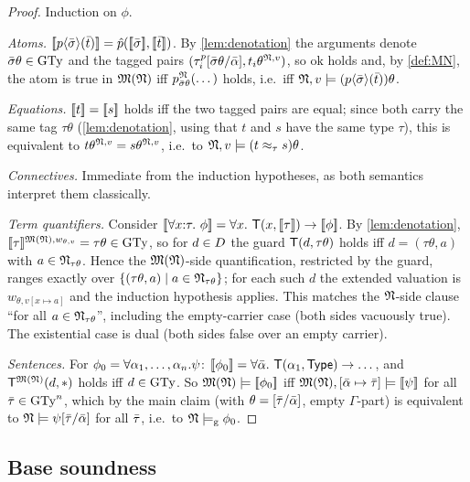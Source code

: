 \begin{proof}
  Induction on $\phi$.

  \emph{Atoms.}  $[\![ p\langle\bar{\sigma}\rangle(\bar{t}) ]\!] =
  \hat p([\![ \bar{\sigma} ]\!],[\![ \bar{t} ]\!])$.  By \cref{lem:denotation} the
  arguments denote $\bar{\sigma}\theta \in \mathrm{GTy}$ and the tagged pairs
  $(\tau^p_i[\bar{\sigma}\theta/\bar{\alpha}], t_i\theta^{\mathfrak{N},v})$, so
  $\mathrm{ok}$ holds and, by \cref{def:MN}, the atom is true in $\mathfrak{M}(\mathfrak{N})$ iff
  $p^{\mathfrak{N}}_{\bar{\sigma}\theta}(\dots)$ holds, i.e.\ iff
  $\mathfrak{N},v \models (p\langle\bar{\sigma}\rangle(\bar{t}))\theta$.

  \emph{Equations.}  $[\![ t ]\!] = [\![ s ]\!]$ holds iff the two tagged pairs are
  equal; since both carry the same tag $\tau\theta$
  (\cref{lem:denotation}, using that $t$ and $s$ have the same type
  $\tau$), this is equivalent to
  $t\theta^{\mathfrak{N},v} = s\theta^{\mathfrak{N},v}$, i.e.\ to
  $\mathfrak{N},v \models (t \approx_{\tau} s)\theta$.

  \emph{Connectives.}  Immediate from the induction hypotheses, as both
  semantics interpret them classically.

  \emph{Term quantifiers.}  Consider
  $\enc{\forall x{:}\tau.\ \phi} = \forall x.\ \T(x,\enc{\tau}) \imp
  \enc{\phi}$.  By \cref{lem:denotation},
  $[\![ \tau ]\!]^{\mathfrak{M}(\mathfrak{N}),w_{\theta,v}} = \tau\theta \in \mathrm{GTy}$, so for
  $d \in D$ the guard $\mathsf{T}(d, \tau\theta)$ holds iff $d = (\tau\theta, a)$
  with $a \in \mathfrak{N}_{\tau\theta}$.  Hence the $\mathfrak{M}(\mathfrak{N})$-side quantification,
  restricted by the guard, ranges exactly over
  $\{(\tau\theta,a) \mid a \in \mathfrak{N}_{\tau\theta}\}$; for each such $d$ the
  extended valuation is $w_{\theta, v[x \mapsto a]}$ and the induction
  hypothesis applies.  This matches the $\mathfrak{N}$-side clause ``for all
  $a \in \mathfrak{N}_{\tau\theta}$'', including the empty-carrier case (both sides
  vacuously true).  The existential case is dual (both sides false over an
  empty carrier).

  \emph{Sentences.}  For
  $\phi_0 = \forall\alpha_1,\dots,\alpha_{n}.\psi$:
  $\enc{\phi_0} = \forall\tup\alpha.\ \T(\alpha_1,\TypeC) \imp \dots$, and
  $\mathsf{T}^{\mathfrak{M}(\mathfrak{N})}(d, \ast)$ holds iff $d \in \mathrm{GTy}$.  So
  $\mathfrak{M}(\mathfrak{N}) \models [\![ \phi_0 ]\!]$ iff $\mathfrak{M}(\mathfrak{N}), [\bar{\alpha} \mapsto \bar{\tau}]
  \models [\![ \psi ]\!]$ for all $\bar{\tau} \in \mathrm{GTy}^n$, which by the main
  claim (with $\theta = [\bar{\tau}/\bar{\alpha}]$, empty $\Gamma$-part) is
  equivalent to $\mathfrak{N} \models \psi[\bar{\tau}/\bar{\alpha}]$ for all
  $\bar{\tau}$, i.e.\ to $\mathfrak{N} \models_{\mathrm{g}} \phi_0$.
\end{proof}

\subsection{Base soundness}

